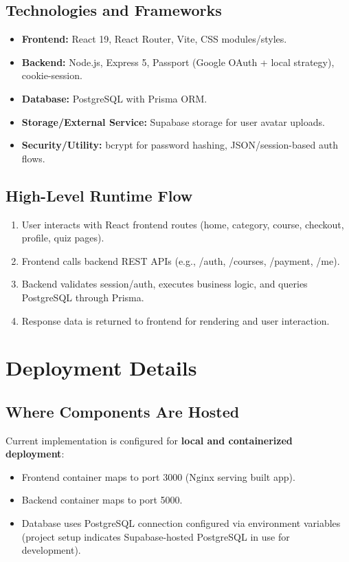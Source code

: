 \documentclass[12pt,a4paper]{report}
\begin{document}
\subsection{Technologies and Frameworks}
\begin{itemize}[leftmargin=*]
  \item \textbf{Frontend:} React 19, React Router, Vite, CSS modules/styles.
  \item \textbf{Backend:} Node.js, Express 5, Passport (Google OAuth + local strategy), cookie-session.
  \item \textbf{Database:} PostgreSQL with Prisma ORM.
  \item \textbf{Storage/External Service:} Supabase storage for user avatar uploads.
  \item \textbf{Security/Utility:} bcrypt for password hashing, JSON/session-based auth flows.
\end{itemize}

\subsection{High-Level Runtime Flow}
\begin{enumerate}[leftmargin=*]
  \item User interacts with React frontend routes (home, category, course, checkout, profile, quiz pages).
  \item Frontend calls backend REST APIs (e.g., /auth, /courses, /payment, /me).
  \item Backend validates session/auth, executes business logic, and queries PostgreSQL through Prisma.
  \item Response data is returned to frontend for rendering and user interaction.
\end{enumerate}

\section{Deployment Details}
\subsection{Where Components Are Hosted}
Current implementation is configured for \textbf{local and containerized deployment}:
\begin{itemize}[leftmargin=*]
  \item Frontend container maps to port 3000 (Nginx serving built app).
  \item Backend container maps to port 5000.
  \item Database uses PostgreSQL connection configured via environment variables (project setup indicates Supabase-hosted PostgreSQL in use for development).
\end{itemize}
\end{document}
